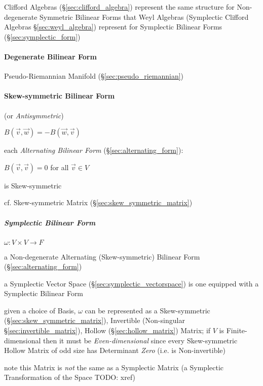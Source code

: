 {{Clifford Algebras (\S\ref{sec:clifford_algebra}) represent the same structure
for Non-degenerate Symmetric Bilinear Forms that Weyl Algebras (Symplectic
Clifford Algebras \S\ref{sec:weyl_algebra}) represent for Symplectic Bilinear
Forms (\S\ref{sec:symplectic_form})



\paragraph{Degenerate Bilinear Form}
\label{sec:degenerate_bilinear_form}\hfill

Pseudo-Riemannian Manifold (\S\ref{sec:pseudo_riemannian})



\paragraph{Skew-symmetric Bilinear Form}
\label{sec:skew_symmetric_bilinear}\hfill

(or \emph{Antisymmetric})

$B(\vec{v},\vec{w}) = -B(\vec{w},\vec{v})$

each \emph{Alternating Bilinear Form} (\S\ref{sec:alternating_form}):

$B(\vec{v},\vec{v}) = 0$ for all $\vec{v} \in V$

is Skew-symmetric

\fist cf. Skew-symmetric Matrix (\S\ref{sec:skew_symmetric_matrix})



\subparagraph{Symplectic Bilinear Form}\label{sec:symplectic_bilinear}\hfill

$\omega : V \times V \rightarrow F$

a Non-degenerate Alternating (Skew-symmetric) Bilinear Form
(\S\ref{sec:alternating_form})

a Symplectic Vector Space (\S\ref{sec:symplectic_vectorspace}) is one equipped
with a Symplectic Bilinear Form

given a choice of Basis, $\omega$ can be represented as a Skew-symmetric
(\S\ref{sec:skew_symmetric_matrix}), Invertible (Non-singular
\S\ref{sec:invertible_matrix}), Hollow (\S\ref{sec:hollow_matrix}) Matrix; if
$V$ is Finite-dimensional then it must be \emph{Even-dimensional} since every
Skew-symmetric Hollow Matrix of odd size has Determinant \emph{Zero} (i.e. is
Non-invertible)

note this Matrix is \emph{not} the same as a Symplectic Matrix (a Symplectic
Transformation of the Space TODO: xref)



}}
